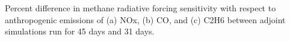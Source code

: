 Percent difference in methane radiative forcing sensitivity with respect to anthropogenic emissions of (a) NOx, (b) CO, and (c) C2H6 between adjoint simulations run for 45 days and 31 days. \label{fig:diffwindow}